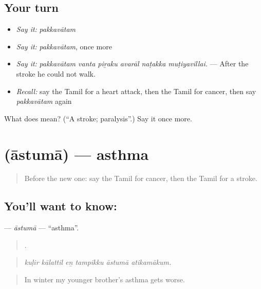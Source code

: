 \subsection*{Your turn}
\begin{itemize}
\raggedright
  \item \emph{Say it:} \emph{pakkavātam}
  \item \emph{Say it:} \emph{pakkavātam}, once more
  \item \emph{Say it:} \emph{pakkavātam vanta piṟaku avarāl naṭakka muṭiyavillai.} — After the stroke he could not walk.
  \item \emph{Recall:} say the Tamil for a heart attack, then the Tamil for cancer, then say \emph{pakkavātam} again
\end{itemize}

\begin{tcolorbox}[breakable,colback=teal!4,colframe=teal!35!black,title={Before you move on}]
What does  mean? (\textquotedblleft{}A stroke; paralysis\textquotedblright{}.) Say it once more.
\end{tcolorbox}
\section[\texorpdfstring{\ta{ஆஸ்துமா} (āstumā)}{ஆஸ்துமா (āstumā)}]{ (āstumā) — asthma}

\label{lesson:TA-C477-astuma}



\begin{quote}
Before the new one: say the Tamil for cancer, then the Tamil for a stroke.
\end{quote}

\subsection*{You'll want to know: }
\textbf{} — \emph{āstumā} — \textquotedblleft{}asthma\textquotedblright{}.

\begin{quote}
     .
\end{quote}

\begin{quote}
\emph{kuḷir kālattil eṉ tampikku āstumā atikamākum.}
\end{quote}

\begin{quote}
In winter my younger brother’s asthma gets worse.
\end{quote}

